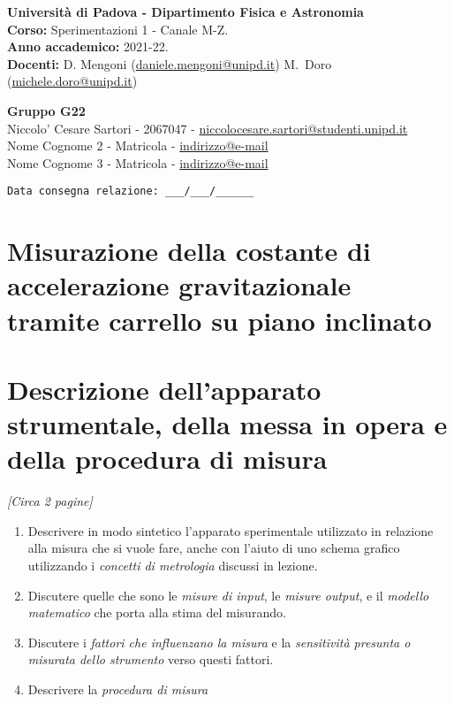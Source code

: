 \documentclass[a4paper, 11pt]{article}
\begin{document}
	\hrulefill
	\begin{flushright}
		\textbf{Universit\`a di Padova - Dipartimento Fisica e Astronomia}\\ 
		\textbf{Corso:} Sperimentazioni 1 - Canale M-Z.\\
		\textbf{Anno accademico:} 2021-22.\\
		\textbf{Docenti:} D. Mengoni (\url{daniele.mengoni@unipd.it}) M.~Doro (\url{michele.doro@unipd.it}) \\
	\end{flushright}
	
	\bigskip
	\noindent
	\large{\textbf{Gruppo G22} \\
		Niccolo' Cesare Sartori - 2067047 - \url{niccolocesare.sartori@studenti.unipd.it} \\
		Nome Cognome 2 - Matricola - \url{indirizzo@e-mail} \\
		Nome Cognome 3 - Matricola - \url{indirizzo@e-mail} \\
		\begin{verbatim}Data consegna relazione: ___/___/______\end{verbatim} \hrulefill 
		
		
		
		
		\section*{Misurazione della costante di accelerazione gravitazionale tramite carrello su piano inclinato}

		
		\section[Metodologia]{Descrizione dell'apparato strumentale, della messa in opera e della procedura di misura}
		\emph{[Circa 2 pagine]}\\
		\begin{enumerate}
			\item Descrivere in modo sintetico l'apparato sperimentale utilizzato in relazione alla misura che si vuole fare, anche con l'aiuto di uno schema grafico utilizzando i \emph{concetti di metrologia} discussi in lezione. 
			\item Discutere quelle che sono le \emph{misure di input}, le \emph{misure output}, e il \emph{modello matematico} che porta alla stima del misurando.
			\item Discutere i \emph{fattori che influenzano la misura} e la \emph{sensitivit\`a presunta o misurata dello strumento} verso questi fattori.
			\item Descrivere la \emph{procedura di misura}
		\end{enumerate}
		
}
\end{document}
